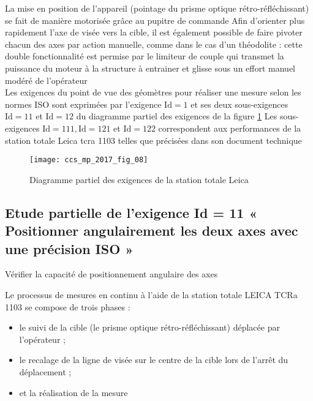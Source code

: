 La mise en position de l'appareil (pointage du prisme optique rétro-réfléchissant) se fait de manière motorisée grâce au pupitre de commande Afin d'orienter plus rapidement l'axe de visée vers la cible, il est également possible de faire pivoter chacun des axes par action manuelle, comme dans le cas d'un théodolite : cette double fonctionnalité est permise par le limiteur de couple qui transmet la puissance du moteur à la structure à entrainer et glisse sous un effort manuel modéré de l'opérateur\\
Les exigences du point de vue des géomètres pour réaliser une mesure selon les normes ISO sont exprimées par l'exigence $\mathrm{Id}=  1  $ et ses deux sous-exigences $\mathrm{Id}=  11  $ et $\mathrm{Id}=  12  $ du diagramme partiel des exigences de la figure \ref{CCS_MP_2017:fig_08} Les sous-exigences $\mathrm{Id}=  11 1  , \mathrm{Id}=  12 1  $ et $\mathrm{Id}=  12 2  $ correspondent aux performances de la station totale Leica tcra 1103 telles que précisées dans son document technique



\begin{figure}[!h]
\centering
\texttt{[image: ccs\_mp\_2017\_fig\_08]}

\caption{Diagramme partiel des exigences de la station totale Leica\label{CCS_MP_2017:fig_08}}
\end{figure}
\fi

\subsection{Etude partielle de l’exigence Id =  11  « Positionner angulairement les deux axes avec
une précision ISO »}
\ifprof
\else

\begin{obj}
Vérifier la capacité de positionnement angulaire des axes
\end{obj}

Le processus de mesures en continu à l'aide de la station totale LEICA TCRa 1103 se compose de trois phases :

\begin{itemize}
  \item le suivi de la cible (le prisme optique rétro-réfléchissant) déplacée par l'opérateur ;
  \item le recalage de la ligne de visée sur le centre de la cible lors de l'arrêt du déplacement ;
  \item et la réalisation de la mesure
\end{itemize}

